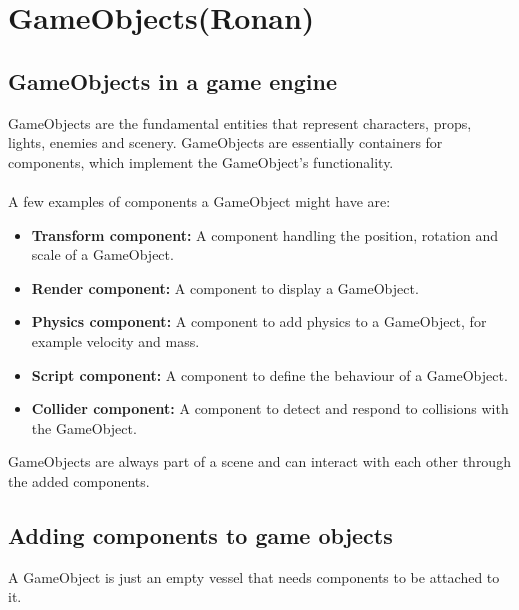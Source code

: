 \section{GameObjects(Ronan)}

\subsection{GameObjects in a game engine}
GameObjects are the fundamental entities that represent characters, props, lights, enemies and scenery.
GameObjects are essentially containers for components, which implement the GameObject's functionality.
\\\\
\noindent A few examples of components a GameObject might have are:
\begin{itemize}
    \item \textbf{Transform component:}
          A component handling the position, rotation and scale of a GameObject.
    \item \textbf{Render component:}
          A component to display a GameObject.
    \item \textbf{Physics component:}
          A component to add physics to a GameObject, for example velocity and mass.
    \item \textbf{Script component:}
          A component to define the behaviour of a GameObject.
    \item \textbf{Collider component:}
          A component to detect and respond to collisions with the GameObject.
\end{itemize}

\noindent GameObjects are always part of a scene and can interact with each other through the added components.

\subsection{Adding components to game objects}
A GameObject is just an empty vessel that needs components to be attached to it.